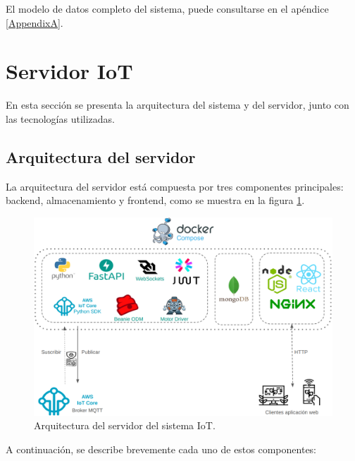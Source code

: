 El modelo de datos completo del sistema, puede consultarse en el apéndice
\ref{AppendixA}.

\section{Servidor IoT}

En esta sección se presenta la arquitectura del sistema y del servidor, junto
con las tecnologías utilizadas.

\subsection{Arquitectura del servidor}

\label{sec:arquitecturaServidor}

La arquitectura del servidor está compuesta por tres componentes principales:
backend, almacenamiento y frontend, como se muestra en la figura
\ref{fig:arquitectura servidor}.

\begin{figure}[H]
    \centering
    \includegraphics[width=\textwidth]{./Images/16.png}
    \caption{Arquitectura del servidor del sistema IoT.}
    \label{fig:arquitectura servidor}
\end{figure}

A continuación, se describe brevemente cada uno de estos componentes:

